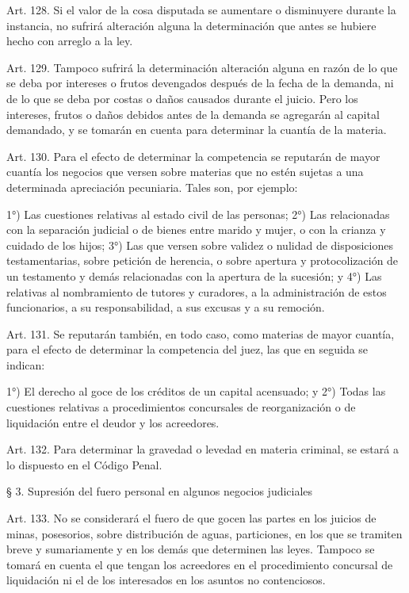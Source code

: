     Art. 128. Si el valor de la cosa disputada se aumentare o disminuyere durante la instancia, no sufrirá alteración alguna la determinación que antes se hubiere hecho con arreglo a la ley.

    Art. 129. Tampoco sufrirá la determinación alteración alguna en razón de lo que se deba por intereses o frutos devengados después de la fecha de la demanda, ni de lo que se deba por costas o daños causados durante el juicio.
    Pero los intereses, frutos o daños debidos antes de la demanda se agregarán al capital demandado, y se tomarán en cuenta para determinar la cuantía de la materia.


    Art. 130. Para el efecto de determinar la competencia se reputarán de mayor cuantía los negocios que versen sobre materias que no estén sujetas a una determinada apreciación pecuniaria. Tales son, por ejemplo:

    1°) Las cuestiones relativas al estado civil de las personas;
    2°) Las relacionadas con la separación judicial o de bienes entre marido y mujer, o con la crianza y cuidado de los hijos;
    3°) Las que versen sobre validez o nulidad de disposiciones testamentarias, sobre petición de herencia, o sobre apertura y protocolización de un testamento y demás relacionadas con la apertura de la sucesión; y
    4°) Las relativas al nombramiento de tutores y curadores, a la administración de estos funcionarios, a su responsabilidad, a sus excusas y a su remoción.



    Art. 131. Se reputarán también, en todo caso, como materias de mayor cuantía, para el efecto de determinar la competencia del juez, las que en seguida se indican:

    1°) El derecho al goce de los créditos de un capital acensuado; y
    2°) Todas las cuestiones relativas a procedimientos concursales de reorganización o de liquidación entre el deudor y los acreedores.


    Art. 132. Para determinar la gravedad o levedad en materia criminal, se estará a lo dispuesto en el Código Penal.

    § 3. Supresión del fuero personal en algunos negocios judiciales


    Art. 133. No se considerará el fuero de que gocen las partes en los juicios de minas, posesorios, sobre distribución de aguas, particiones, en los que se tramiten breve y sumariamente y en los demás que determinen las leyes.
    Tampoco se tomará en cuenta el que tengan los acreedores en el procedimiento concursal de liquidación ni el de los interesados en los asuntos no contenciosos.



